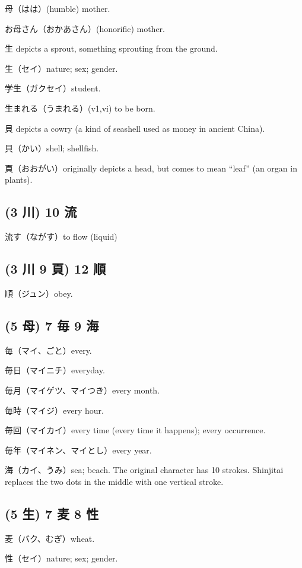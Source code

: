 母（はは）(humble) mother.

お母さん（おかあさん）(honorific) mother.

生 depicts a sprout, something sprouting from the ground.

生（セイ）nature; sex; gender.

学生（ガクセイ）student.

生まれる（うまれる）(v1,vi) to be born.

貝 depicts a cowry (a kind of seashell used as money in ancient China).

貝（かい）shell; shellfish.

頁（おおがい）originally depicts a head,
but comes to mean ``leaf'' (an organ in plants).

\subsection{(3 川) 10 流}

流す（ながす）to flow (liquid)

\subsection{(3 川 9 頁) 12 順}

順（ジュン）obey.

\subsection{(5 母) 7 毎 9 海}

毎（マイ、ごと）every.

毎日（マイニチ）everyday.

毎月（マイゲツ、マイつき）every month.

毎時（マイジ）every hour.

毎回（マイカイ）every time (every time it happens); every occurrence.

毎年（マイネン、マイとし）every year.

海（カイ、うみ）sea; beach.
The original character has 10 strokes.
Shinjitai replaces the two dots in the middle
with one vertical stroke.

\subsection{(5 生) 7 麦 8 性}

麦（バク、むぎ）wheat.

性（セイ）nature; sex; gender.

